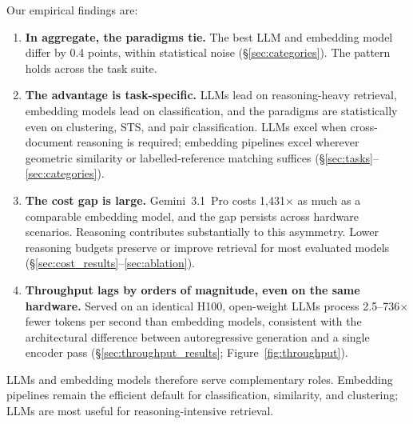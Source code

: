 Our empirical findings are:
\begin{enumerate}
    \item \textbf{In aggregate, the paradigms tie.}
    The best LLM and embedding model differ by 0.4 points, within statistical noise (\S\ref{sec:categories}).
    The pattern holds across the task suite.

    \item \textbf{The advantage is task-specific.}
    LLMs lead on reasoning-heavy retrieval, embedding models lead on classification, and the paradigms are statistically even on clustering, STS, and pair classification.
    LLMs excel when cross-document reasoning is required; embedding pipelines excel wherever geometric similarity or labelled-reference matching suffices (\S\ref{sec:tasks}--\ref{sec:categories}).

    \item \textbf{The cost gap is large.}
    Gemini~3.1~Pro costs 1{,}431$\times$ as much as a comparable embedding model, and the gap persists across hardware scenarios.
    Reasoning contributes substantially to this asymmetry. Lower reasoning budgets preserve or improve retrieval for most evaluated models (\S\ref{sec:cost_results}--\ref{sec:ablation}).

    \item \textbf{Throughput lags by orders of magnitude, even on the same hardware.}
    Served on an identical H100, open-weight LLMs process 2.5--736$\times$ fewer tokens per second than embedding models, consistent with the architectural difference between autoregressive generation and a single encoder pass (\S\ref{sec:throughput_results}; Figure~\ref{fig:throughput}).
\end{enumerate}

LLMs and embedding models therefore serve complementary roles. Embedding pipelines remain the efficient default for classification, similarity, and clustering; LLMs are most useful for reasoning-intensive retrieval.
